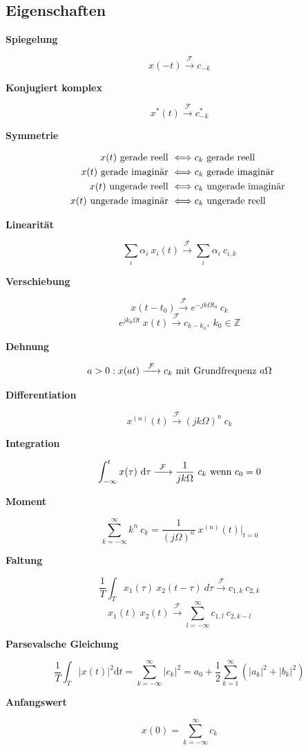 \documentclass[10pt,a4paper]{article}
\newcommand{\fancyformula}[2]{
	\small
	\raggedright\sffamily\textbf{#1}
	#2
}
\newcommand{\ftransform}{
	\xrightarrow{~\mathcal{F}~}
}
\begin{document}
\subsection*{Eigenschaften}
\begin{multicols}{2}
\fancyformula{Spiegelung}{
	\[ x(-t)  \ftransform c_{-k} \]
}

\fancyformula{Konjugiert komplex}{
	\[ x^*(t)  \ftransform c^*_{-k} \]
}

\fancyformula{Symmetrie}{
 \begin{align*}
	x(t) \textnormal{ gerade reell } &\Longleftrightarrow c_k \textnormal{ gerade reell } \\
	x(t) \textnormal{ gerade imaginär } &\Longleftrightarrow c_k \textnormal{ gerade imaginär } \\
	x(t) \textnormal{ ungerade reell } &\Longleftrightarrow c_k \textnormal{ ungerade imaginär } \\
	x(t) \textnormal{ ungerade imaginär } &\Longleftrightarrow c_k \textnormal{ ungerade reell }
\end{align*}
}

\fancyformula{Linearität}{
	\[ \sum_i \alpha_i ~ x_i(t) \ftransform \sum_i \alpha_i ~ c_{i, k} \]
}

\fancyformula{Verschiebung}{
	\[ x(t - t_0) \ftransform e^{-jk\Omega t_0} ~ c_k \]
	\[ e^{jk_0\Omega t} ~ x(t) \ftransform c_{k-k_0}, ~ k_0 \in \mathbb Z \]
}

\fancyformula{Dehnung}{
	\[ a > 0: x(at) \ftransform c_k \textnormal{ mit Grundfrequenz } a\Omega \]
}

\fancyformula{Differentiation}{
	\[ x^{(n)}(t) \ftransform (jk\Omega)^n ~ c_k \]
}

\fancyformula{Integration}{
	\[ \int_{-\infty}^t x(\tau) ~ \mathrm d\tau \ftransform \frac{1}{jk\Omega} ~ c_k \textnormal{ wenn } c_0 = 0 \]
}

\fancyformula{Moment}{
	\[ \sum_{k=-\infty}^\infty k^n ~ c_k = \frac{1}{(j\Omega)^n} ~ x^{(n)}(t) \bigg|_{t=0} \]
}

\fancyformula{Faltung}{
	\[ \frac{1}{T} \int_T x_1(\tau) ~ x_2(t - \tau) \mathrm ~ d\tau \ftransform c_{1,k} ~ c_{2, k} \]
	\[ x_1(t) ~ x_2(t) \ftransform \sum_{l=-\infty}^{\infty} c_{1, l} ~ c_{2, k - l} \]
}

\fancyformula{Parsevalsche Gleichung}{
	\[ \frac{1}{T} \int_T |x(t)|^2 \mathrm dt = \sum_{k = -\infty}^{\infty} |c_k|^2 = a_0 + \frac{1}{2} \sum_{k=1}^{\infty} \left(|a_k|^2 + |b_k|^2 \right) \]
}
\fancyformula{Anfangswert}{
	\[ x(0) = \sum_{k=-\infty}^{\infty} c_k \]
}
\end{multicols}
\end{document}
